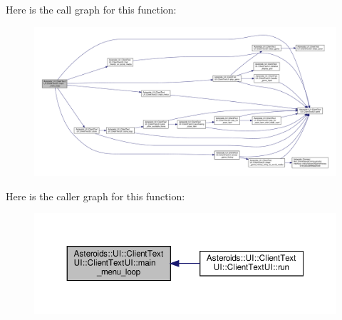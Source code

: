Here is the call graph for this function\+:
\nopagebreak
\begin{figure}[H]
\begin{center}
\leavevmode
\includegraphics[width=350pt]{classAsteroids_1_1UI_1_1ClientTextUI_1_1ClientTextUI_a67521714973f97f76618f9598d34d3b8_cgraph}
\end{center}
\end{figure}
Here is the caller graph for this function\+:
\nopagebreak
\begin{figure}[H]
\begin{center}
\leavevmode
\includegraphics[width=350pt]{classAsteroids_1_1UI_1_1ClientTextUI_1_1ClientTextUI_a67521714973f97f76618f9598d34d3b8_icgraph}
\end{center}
\end{figure}
\mbox{\label{classAsteroids_1_1UI_1_1ClientTextUI_1_1ClientTextUI_a4613a9af03e06c960c467b0b6be44db9}} 
